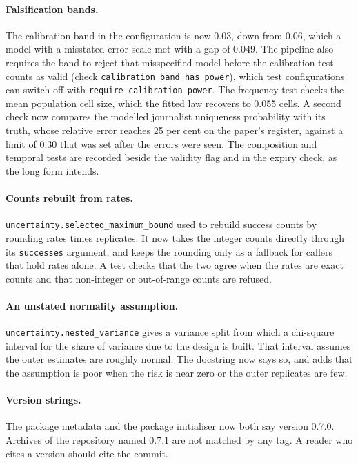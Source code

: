 \paragraph{Falsification bands.} The calibration band in the configuration is now 0.03,
down from 0.06, which a model with a misstated error scale met with a gap of 0.049. The
pipeline also requires the band to reject that misspecified model before the calibration
test counts as valid (check \texttt{calibration\_\allowbreak{}band\_\allowbreak{}has\_\allowbreak{}power}),
which test configurations can switch off with \texttt{require\_\allowbreak{}calibration\_\allowbreak{}power}. The
frequency test checks the mean population cell size, which the fitted law recovers to
0.055 cells. A second check now compares the modelled journalist uniqueness probability
with its truth, whose relative error reaches 25 per cent on the paper's register, against a
limit of 0.30 that was set after the errors were seen. %
The composition and temporal tests are recorded beside the validity flag and in the
expiry check, as the long form intends.

\paragraph{Counts rebuilt from rates.} \texttt{uncertainty.\allowbreak{}selected\_\allowbreak{}maximum\_\allowbreak{}bound}
used to rebuild success counts by rounding rates times replicates. It now takes the
integer counts directly through its \texttt{successes} argument, and keeps the rounding only as a
fallback for callers that hold rates alone. A test checks that the two agree when the rates are exact counts and that
non-integer or out-of-range counts are refused.

\paragraph{An unstated normality assumption.} \texttt{uncertainty.\allowbreak{}nested\_\allowbreak{}variance}
gives a variance split from which a chi-square interval for the share of variance due to the design
is built. That interval assumes the outer estimates are roughly normal. The docstring now says so, and
adds that the assumption is poor when the risk is near zero or the outer replicates are few.

\paragraph{Version strings.} The package metadata and the package initialiser now both
say version 0.7.0. Archives of the repository named 0.7.1 are not matched by any tag.
A reader who cites a version should cite the commit.

